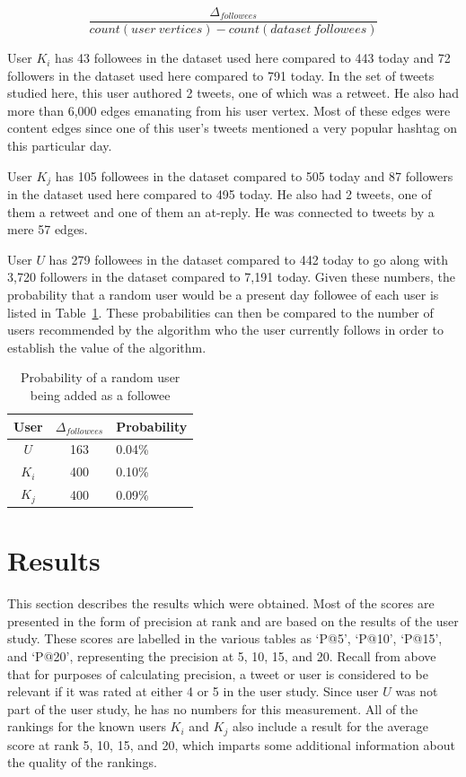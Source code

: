 \begin{center}
\[
\frac{\Delta_{followees} }{count(user\ vertices) - count(dataset\ followees)}
\]
\end{center}


User $K_{i}$ has 43 followees in the dataset used here compared to 443 today and 72 followers in the dataset used here compared to 791 today. In the set of tweets studied here, this user authored 2 tweets, one of which was a retweet. He also had more than 6,000 edges emanating from his user vertex. Most of these edges were content edges since one of this user's tweets mentioned a very popular hashtag on this particular day.

User $K_{j}$ has 105 followees in the dataset compared to 505 today and 87 followers in the dataset used here compared to 495 today. He also had 2 tweets, one of them a retweet and one of them an at-reply. He was connected to tweets by a mere 57 edges.

User $U$ has 279 followees in the dataset compared to 442 today to go along with 3,720 followers in the dataset compared to 7,191 today. Given these numbers, the probability that a random user would be a present day followee of each user is listed in Table~\ref{tab:RandomUserFolloweeProb}. These probabilities can then be compared to the number of users recommended by the algorithm who the user currently follows in order to establish the value of the algorithm.

\begin{table}
\centering
\begin{tabular}{c|c|l}
{\bf User} & {\bf $\Delta_{followees}$ } & {\bf Probability} \\ \hline
$U$ & 163 &  0.04\%   \\ \hline
$K_{i}$ & 400 & 0.10\% \\ \hline
$K_{j}$ & 400 & 0.09\% \\
\end{tabular}
\caption{Probability of a random user being added as a followee}
\label{tab:RandomUserFolloweeProb}
\end{table}


\section{Results}

This section describes the results which were obtained. Most of the scores are presented in the form of precision at rank and are based on the results of the user study. These scores are labelled in the various tables as `P@5', `P@10', `P@15', and `P@20', representing the precision at 5, 10, 15, and 20. Recall from above that for purposes of calculating precision, a tweet or user is considered to be relevant if it was rated at either 4 or 5 in the user study. Since user $U$ was not part of the user study, he has no numbers for this measurement. All of the rankings for the known users $K_{i}$ and $K_{j}$ also include a result for the average score at rank 5, 10, 15, and 20, which imparts some additional information about the quality of the rankings.

